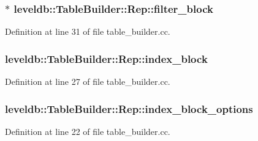 \hypertarget{structleveldb_1_1_table_builder_1_1_rep_aad1620ca746b7287a819880be083ec6b}{}
\subsubsection[{filter\+\_\+block}]{$\ast$ leveldb\+::\+Table\+Builder\+::\+Rep\+::filter\+\_\+block}\label{structleveldb_1_1_table_builder_1_1_rep_aad1620ca746b7287a819880be083ec6b}


Definition at line 31 of file table\+\_\+builder.\+cc.

\hypertarget{structleveldb_1_1_table_builder_1_1_rep_a7d5740122ca84239cb009d513cf14681}{}
\subsubsection[{index\+\_\+block}]{ leveldb\+::\+Table\+Builder\+::\+Rep\+::index\+\_\+block}\label{structleveldb_1_1_table_builder_1_1_rep_a7d5740122ca84239cb009d513cf14681}


Definition at line 27 of file table\+\_\+builder.\+cc.

\hypertarget{structleveldb_1_1_table_builder_1_1_rep_a3ae22fe880ca1b98c3a7e24c1ec72c98}{}
\subsubsection[{index\+\_\+block\+\_\+options}]{ leveldb\+::\+Table\+Builder\+::\+Rep\+::index\+\_\+block\+\_\+options}\label{structleveldb_1_1_table_builder_1_1_rep_a3ae22fe880ca1b98c3a7e24c1ec72c98}


Definition at line 22 of file table\+\_\+builder.\+cc.

